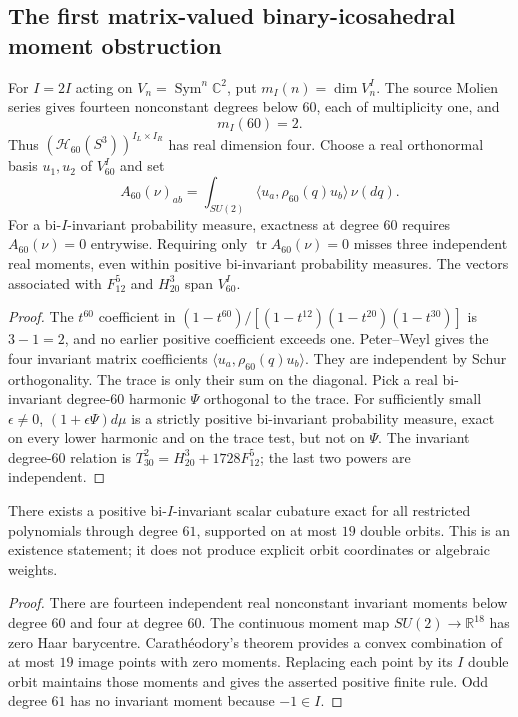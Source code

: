 \documentclass[11pt]{article}
\begin{document}
\subsection{The first matrix-valued binary-icosahedral moment obstruction}
\label{p1b:sec:cc111-degree60-matrix}
\begin{theorem}
\label{p1b:thm:cc111-degree60-matrix}
For $I=2I$ acting on $V_n=\operatorname{Sym}^n\mathbb C^2$, put
$m_I(n)=\dim V_n^I$. The source Molien series gives fourteen
nonconstant degrees below $60$, each of multiplicity one, and
\[\boxed{m_I(60)=2.}\]
Thus $(\mathcal H_{60}(S^3))^{I_L\times I_R}$ has real dimension four.
Choose a real orthonormal basis $u_1,u_2$ of $V_{60}^I$ and set
\[
A_{60}(\nu)_{ab}=
\int_{SU(2)}\langle u_a,\rho_{60}(q)u_b\rangle\,\nu(dq).
\]
For a bi-$I$-invariant probability measure, exactness at degree $60$
requires $A_{60}(\nu)=0$ entrywise. Requiring only
$\operatorname{tr}A_{60}(\nu)=0$ misses three independent real
moments, even within positive bi-invariant probability measures.
The vectors associated with $F_{12}^5$ and $H_{20}^3$ span $V_{60}^I$.
\end{theorem}
\begin{proof}
The $t^{60}$ coefficient in
$(1-t^{60})/[(1-t^{12})(1-t^{20})(1-t^{30})]$
is $3-1=2$, and no earlier positive coefficient exceeds one.
Peter--Weyl gives the four invariant matrix coefficients
$\langle u_a,\rho_{60}(q)u_b\rangle$.
They are independent by Schur orthogonality. The trace is only their
sum on the diagonal. Pick a real bi-invariant degree-$60$ harmonic
$\Psi$ orthogonal to the trace. For sufficiently small
$\epsilon\ne0$, $(1+\epsilon\Psi)d\mu$ is a strictly positive
bi-invariant probability measure, exact on every lower harmonic and
on the trace test, but not on $\Psi$.
The invariant degree-$60$ relation is
$T_{30}^2=H_{20}^3+1728F_{12}^5$; the last two powers are independent.
\end{proof}
\begin{corollary}
\label{p1b:cor:cc111-degree61-existence}
There exists a positive bi-$I$-invariant scalar cubature exact for all
restricted polynomials through degree $61$, supported on at most
$19$ double orbits. This is an existence statement; it does not produce
explicit orbit coordinates or algebraic weights.
\end{corollary}
\begin{proof}
There are fourteen independent real nonconstant invariant moments
below degree $60$ and four at degree $60$. The continuous moment map
$SU(2)\to\mathbb R^{18}$ has zero Haar barycentre. Carath\'eodory's
theorem provides a convex combination of at most $19$ image points
with zero moments. Replacing each point by its $I$ double orbit
maintains those moments and gives the asserted positive finite rule.
Odd degree $61$ has no invariant moment because $-1\in I$.
\end{proof}
\end{document}
